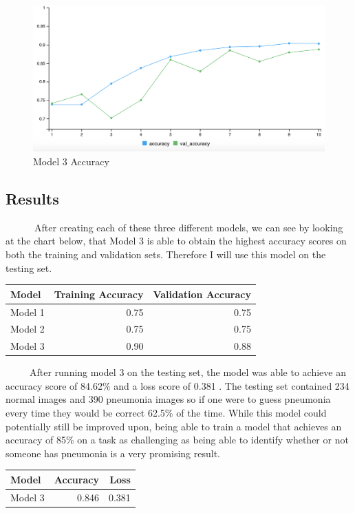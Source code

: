 \documentclass[12pt]{article}
\begin{document}
\begin{figure}

{\centering \includegraphics[width=0.75\linewidth,height=0.25\textheight]{images/model3out} 

}

\caption{Model 3 Accuracy}\label{fig:sample-fig10}
\end{figure}

\hypertarget{results}{%
\subsection{Results}\label{results}}

~~~~~~After creating each of these three different models, we can see by
looking at the chart below, that Model 3 is able to obtain the highest
accuracy scores on both the training and validation sets. Therefore I
will use this model on the testing set. ~

\begin{tabular}{l|r|r}
\hline
Model & Training Accuracy & Validation Accuracy\\
\hline
Model 1 & 0.75 & 0.75\\
\hline
Model 2 & 0.75 & 0.75\\
\hline
Model 3 & 0.90 & 0.88\\
\hline
\end{tabular}

~~~~~After running model 3 on the testing set, the model was able to
achieve an accuracy score of 84.62\% and a loss score of 0.381 . The
testing set contained 234 normal images and 390 pneumonia images so if
one were to guess pneumonia every time they would be correct 62.5\% of
the time. While this model could potentially still be improved upon,
being able to train a model that achieves an accuracy of 85\% on a task
as challenging as being able to identify whether or not someone has
pneumonia is a very promising result. ~

\begin{tabular}{l|r|r}
\hline
Model & Accuracy & Loss \\
\hline
Model 3 & 0.846 & 0.381\\
\hline
\end{tabular}
\end{document}
